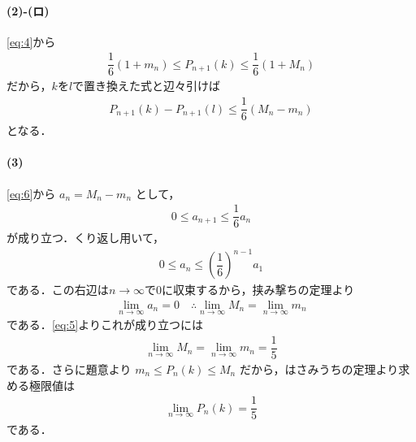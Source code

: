 \documentclass[../../main.tex]{subfiles}
\begin{document}
\paragraph{(2)-(ロ)}

\cref{eq:4}から
\begin{align}
  \dfrac{1}{6}(1 + m_n) \le P_{n+1}(k) \le \dfrac{1}{6}(1 + M_n)
\end{align}
だから，$k$を$l$で置き換えた式と辺々引けば
\begin{align}
  P_{n+1}(k) - P_{n+1}(l) \le \dfrac{1}{6}(M_n - m_n) \label{eq:6}
\end{align}
となる．

\paragraph{(3)}

\cref{eq:6}から $a_n = M_n - m_n$ として，
\begin{align}
  0 \le a_{n+1} \le \dfrac{1}{6} a_n
\end{align}
が成り立つ．くり返し用いて，
\begin{align}
  0 \le a_n \le \left(\dfrac{1}{6}\right)^{n-1} a_1
\end{align}
である．この右辺は$n\to\infty$で$0$に収束するから，挟み撃ちの定理より
\begin{align}
  \lim_{n\to\infty} a_n = 0
  \quad \therefore
  \lim_{n\to\infty} M_n = \lim_{n\to\infty} m_n
\end{align}
である．\cref{eq:5}よりこれが成り立つには
\begin{align}
  \lim_{n\to\infty}M_n= \lim_{n\to\infty} m_n =  \dfrac{1}{5}
\end{align}
である．さらに題意より $m_n \le P_n(k) \le M_n$ だから，はさみうちの定理より求める極限値は
\begin{align}
  \lim_{n\to\infty} P_n(k) = \dfrac{1}{5}
\end{align}
である．
\end{document}
